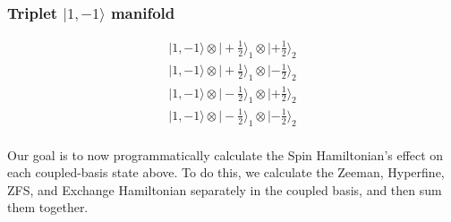 \documentclass[svgnames]{article}
\begin{document}
\subsubsection*{Triplet  $|1, -1\rangle$ manifold}
\begin{align*}
  |1, -1\rangle \otimes |+\frac{1}{2}\rangle_1 \otimes | +\frac{1}{2} \rangle_2 \\ 
  |1, -1\rangle \otimes |+\frac{1}{2}\rangle_1 \otimes | -\frac{1}{2} \rangle_2 \\ 
  |1, -1\rangle \otimes |-\frac{1}{2}\rangle_1 \otimes | +\frac{1}{2} \rangle_2 \\ 
  |1, -1\rangle \otimes |-\frac{1}{2}\rangle_1 \otimes | -\frac{1}{2} \rangle_2 \\ 
\end{align*}

Our goal is to now programmatically calculate the Spin Hamiltonian's effect on
each coupled-basis state above. To do this, we calculate the Zeeman, Hyperfine,
ZFS, and Exchange Hamiltonian separately in the coupled basis, and then sum them
together. 
\end{document}
